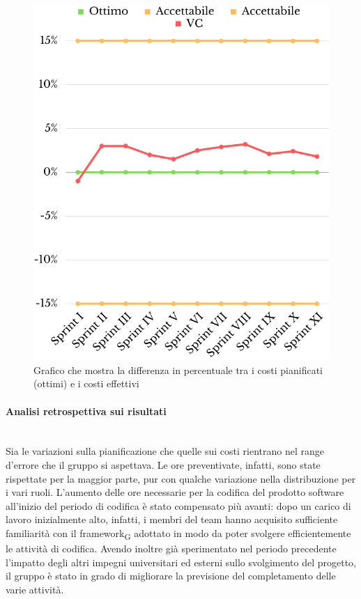 \begin{figure}[H]
	\centering
	\includegraphics[scale=0.5]{img/CV2.png}
	\caption{Grafico che mostra la differenza in percentuale tra i costi pianificati (ottimi) e i costi effettivi}
\end{figure}
\paragraph{Analisi retrospettiva sui risultati}\mbox{}\\
Sia le variazioni sulla pianificazione che quelle sui costi rientrano nel range d'errore che il gruppo si aspettava. 
Le ore preventivate, infatti, sono state rispettate per la maggior parte, pur con qualche variazione nella distribuzione per i vari ruoli. L'aumento delle ore necessarie per la codifica del prodotto software all'inizio del periodo di codifica è stato compensato più avanti: dopo un carico di lavoro inizialmente alto, infatti, i membri del team hanno acquisito sufficiente familiarità con il framework\textsubscript{G} adottato in modo da poter svolgere efficientemente le attività di codifica.
Avendo inoltre già sperimentato nel periodo precedente l'impatto degli altri impegni universitari ed esterni sullo svolgimento del progetto, il gruppo è stato in grado di migliorare la previsione del completamento delle varie attività.

